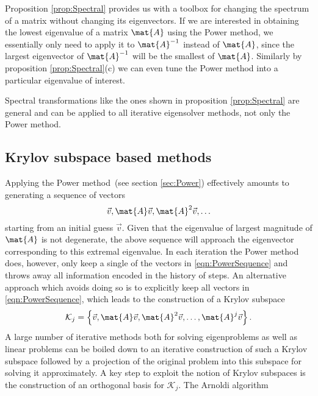 Proposition \ref{prop:Spectral} provides us with a toolbox for
changing the spectrum of a matrix without changing its eigenvectors.
If we are interested in obtaining the lowest eigenvalue of a matrix $\mat{A}$
using the Power method,
we essentially only need to apply it to $\mat{A}^{-1}$ instead
of  $\mat{A}$, since the largest eigenvector of $\mat{A}^{-1}$ will be
the smallest of $\mat{A}$.
Similarly by proposition \ref{prop:Spectral}(c)
we can even tune the Power method into a particular eigenvalue of interest.

Spectral transformations like the ones shown in proposition \ref{prop:Spectral}
are general and can be applied to all iterative eigensolver methods,
not only the Power method.


\subsection{Krylov subspace based methods}
\label{sec:Arnoldi}
Applying the Power method~(see section \ref{sec:Power})
effectively amounts to generating a sequence of vectors
\begin{equation}
	\vec{v}, \mat{A} \vec{v}, \mat{A}^2 \vec{v}, \ldots
	\label{eqn:PowerSequence}
\end{equation}
starting from an initial guess $\vec{v}$.
Given that the eigenvalue of largest magnitude of $\mat{A}$ is not degenerate,
the above sequence will approach the eigenvector corresponding to this
extremal eigenvalue.
In each iteration the Power method does, however,
only keep a single of the vectors in \eqref{eqn:PowerSequence}
and throws away all information encoded in the history of steps.
An alternative approach which avoids doing so is
to explicitly keep all vectors in \eqref{eqn:PowerSequence},
which leads to the construction of a Krylov subspace~\cite{Arbenz2010}
\begin{equation}
	\mathcal{K}_j = \left\{\vec{v}, \mat{A} \vec{v}, \mat{A}^2 \vec{v},
	\ldots, \mat{A}^j \vec{v} \right\}.
	\label{eqn:KrylovSubspace}
\end{equation}
A large number of iterative methods both for solving eigenproblems
as well as linear problems
can be boiled down to an iterative construction of such a
Krylov subspace followed by a projection of the original problem
into this subspace for solving it approximately.
A key step to exploit the notion of Krylov subspaces
is the construction of an orthogonal basis for $\mathcal{K}_j$.
The Arnoldi algorithm~\cite{Arnoldi1951}
